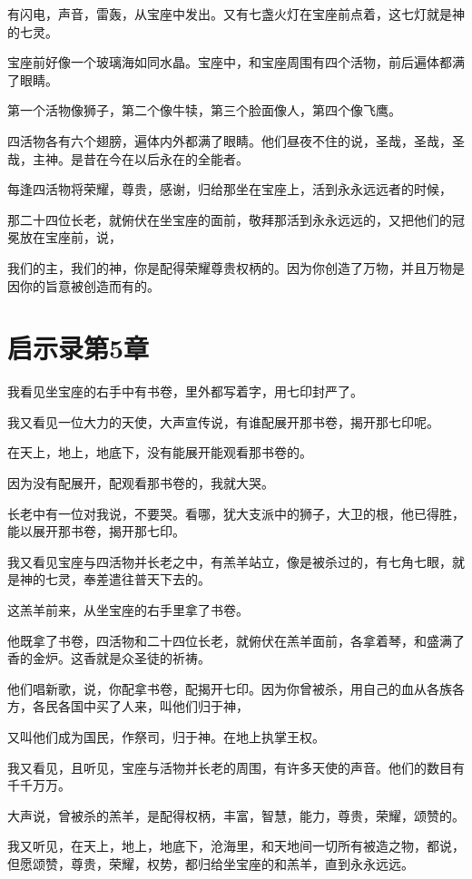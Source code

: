 \documentclass[12pt,oneside]{book}
\begin{document}
有闪电，声音，雷轰，从宝座中发出。又有七盏火灯在宝座前点着，这七灯就是神的七灵。

宝座前好像一个玻璃海如同水晶。宝座中，和宝座周围有四个活物，前后遍体都满了眼睛。

第一个活物像狮子，第二个像牛犊，第三个脸面像人，第四个像飞鹰。

四活物各有六个翅膀，遍体内外都满了眼睛。他们昼夜不住的说，圣哉，圣哉，圣哉，主神。是昔在今在以后永在的全能者。

每逢四活物将荣耀，尊贵，感谢，归给那坐在宝座上，活到永永远远者的时候，

那二十四位长老，就俯伏在坐宝座的面前，敬拜那活到永永远远的，又把他们的冠冕放在宝座前，说，

我们的主，我们的神，你是配得荣耀尊贵权柄的。因为你创造了万物，并且万物是因你的旨意被创造而有的。

\chapter{启示录第5章}
我看见坐宝座的右手中有书卷，里外都写着字，用七印封严了。

我又看见一位大力的天使，大声宣传说，有谁配展开那书卷，揭开那七印呢。

在天上，地上，地底下，没有能展开能观看那书卷的。

因为没有配展开，配观看那书卷的，我就大哭。

长老中有一位对我说，不要哭。看哪，犹大支派中的狮子，大卫的根，他已得胜，能以展开那书卷，揭开那七印。

我又看见宝座与四活物并长老之中，有羔羊站立，像是被杀过的，有七角七眼，就是神的七灵，奉差遣往普天下去的。

这羔羊前来，从坐宝座的右手里拿了书卷。

他既拿了书卷，四活物和二十四位长老，就俯伏在羔羊面前，各拿着琴，和盛满了香的金炉。这香就是众圣徒的祈祷。

他们唱新歌，说，你配拿书卷，配揭开七印。因为你曾被杀，用自己的血从各族各方，各民各国中买了人来，叫他们归于神，

又叫他们成为国民，作祭司，归于神。在地上执掌王权。

我又看见，且听见，宝座与活物并长老的周围，有许多天使的声音。他们的数目有千千万万。

大声说，曾被杀的羔羊，是配得权柄，丰富，智慧，能力，尊贵，荣耀，颂赞的。

我又听见，在天上，地上，地底下，沧海里，和天地间一切所有被造之物，都说，但愿颂赞，尊贵，荣耀，权势，都归给坐宝座的和羔羊，直到永永远远。
\end{document}
